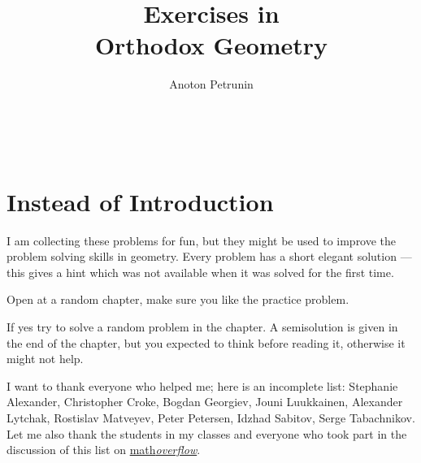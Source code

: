 \documentclass[twoside]{book}
\begin{document}
\title{Exercises in \\
Orthodox Geometry}
\author{Anoton Petrunin}

\date{}
\maketitle



\null\vfill{}

\ 

\thispagestyle{empty}

\tableofcontents

\newpage

\section*{Instead of Introduction}

I am collecting these problems for fun, 
but they might be used to improve 
the problem solving skills in geometry.
Every problem has a short elegant solution ---
this gives a hint which was not available
when it was solved for the first time.

Open at a random chapter, make sure you like the practice problem.

If yes try to solve a random problem in the chapter.
A semisolution is given in the end of the chapter,
but you expected to think before reading it,
otherwise it might not help. 

I want to thank everyone who helped me;
here is an incomplete list:
Stephanie Alexander,
Christopher Croke,
Bogdan Georgiev,
Jouni Luukkainen,
Alexander Lytchak,
Rostislav Matve\-yev, 
Peter Petersen, 
Idzhad Sabitov,
Serge Tabachnikov.
Let me also thank  the students in my classes 
and everyone who took part in the discussion of this list 
on \href{http://mathoverflow.net/questions/8247}{math\textit{overflow}}.
\end{document}
